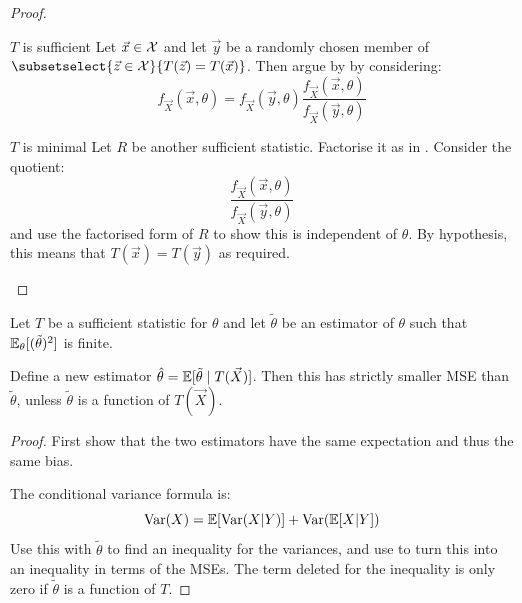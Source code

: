 \documentclass[../Main.tex]{subfiles}
\begin{document}
\begin{proof}
    \begin{subproof}{$T$ is sufficient}
        Let $\vec{x} \in \mathcal{X}$ and let $\vec{y}$ be a randomly chosen member of $\subsetselect{\vec{z} \in \samplespace}{T(\vec{z}) = T(\vec{x})}$.
        Then argue by  by considering:
        \begin{equation*}
            f_{\vec{X}}(\vec{x}, \theta) = f_{\vec{X}}(\vec{y}, \theta) \frac{f_{\vec{X}}(\vec{x}, \theta)}{f_{\vec{X}}(\vec{y}, \theta)}
        \end{equation*}
    \end{subproof}
    \begin{subproof}{$T$ is minimal}
        Let $R$ be another sufficient statistic. Factorise it as in . Consider the quotient:
        \begin{equation*}
            \frac{f_{\vec{X}}(\vec{x}, \theta)}{f_{\vec{X}}(\vec{y}, \theta)}
        \end{equation*}
        and use the factorised form of $R$ to show this is independent of $\theta$. By hypothesis, this means that $T(\vec{x}) = T(\vec{y})$ as required.
    \end{subproof}
\end{proof}
\begin{theorem}
    Let $T$ be a sufficient statistic for $\theta$ and let $\tilde{\theta}$ be an estimator of $\theta$ such that $\mathbb{E}_\theta[(\tilde{\theta})^2]$ is finite.

    Define a new estimator $\hat{\theta} = \mathbb{E}[\tilde{\theta} \mid T(\vec{X})]$. Then this has strictly smaller MSE than $\tilde{\theta}$, unless $\tilde{\theta}$ is a function of $T(\vec{X})$.
    \label{thmRaoBlackwell}
\end{theorem}
\begin{proof}
    First show that the two estimators have the same expectation and thus the same bias.

    The conditional variance formula is:
    \begin{equation*}
        \operatorname{Var}(X) = \mathbb{E}[\operatorname{Var}(X | Y)] + \operatorname{Var}(\mathbb{E}[X | Y])
    \end{equation*}
    Use this with $\tilde{\theta}$ to find an inequality for the variances, and use  to turn this into an inequality in terms of the MSEs. The term deleted for the inequality is only zero if $\tilde\theta$ is a function of $T$.
\end{proof}
\end{document}
